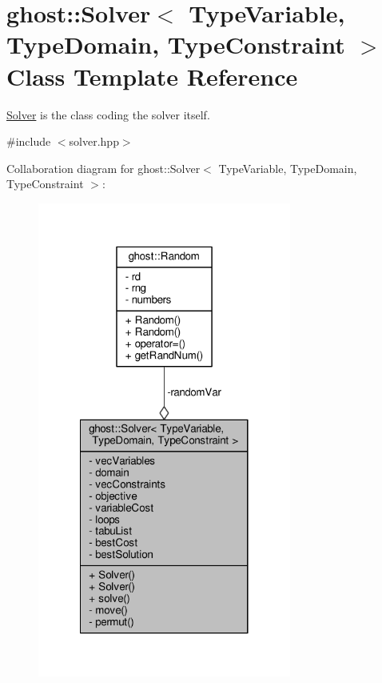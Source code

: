 \hypertarget{classghost_1_1Solver}{\section{ghost\-:\-:Solver$<$ Type\-Variable, Type\-Domain, Type\-Constraint $>$ Class Template Reference}
\label{classghost_1_1Solver}
}


\hyperlink{classghost_1_1Solver}{Solver} is the class coding the solver itself.  




{\ttfamily \#include $<$solver.\-hpp$>$}



Collaboration diagram for ghost\-:\-:Solver$<$ Type\-Variable, Type\-Domain, Type\-Constraint $>$\-:
\nopagebreak
\begin{figure}[H]
\begin{center}
\leavevmode
\includegraphics[width=236pt]{classghost_1_1Solver__coll__graph}
\end{center}
\end{figure}
